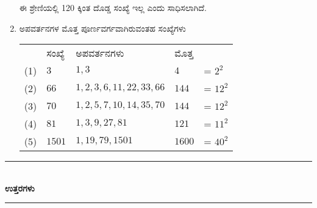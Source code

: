 \begin{enumerate}
ಈ ಶ್ರೇಣಿಯಲ್ಲಿ 120 ಕ್ಕಿಂತ ದೊಡ್ಡ ಸಂಖ್ಯೆ ಇಲ್ಲ ಎಂದು ಸಾಧಿಸಲಾಗಿದೆ. 

\item ಅಪವರ್ತನಗಳ ಮೊತ್ತ ಪೂರ್ಣವರ್ಗವಾಗಿರುವಂತಹ ಸಂಖ್ಯೆಗಳು 

\begin{tabular}[t]{lllll}
 & ಸಂಖ್ಯೆ & ಅಪವರ್ತನಗಳು & ಮೊತ್ತ & \\
 (1) & $3$ & $1, 3$ & $4$ & = $2^{2}$\\
 (2) & $66$ & $1, 2, 3, 6, 11, 22, 33, 66$ & $144$ & = $12^{2}$\\
 (3) & $70$ & $1, 2, 5, 7, 10, 14, 35, 70$ & $144$ & = $12^{2}$\\
 (4) & $81$ & $1, 3, 9, 27, 81$ & $121$ & = $11^{2}$\\
 (5) & $1501$ & $1, 19, 79, 1501$ & $1600$ & = $40^{2}$
\end{tabular}
\end{enumerate}

\smallskip

\begin{center}
\rule{5cm}{1pt}\\[5pt]
{\Large\bfseries ಉತ್ತರಗಳು}\\[3pt]
\rule{5cm}{1pt}
\end{center}

